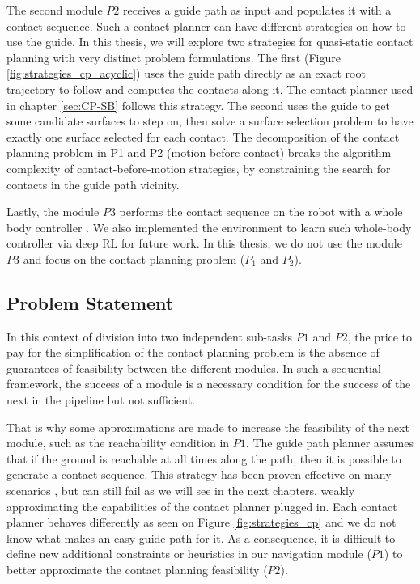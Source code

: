 The second module $P2$ receives a guide path as input and populates it with a contact sequence. Such a contact planner can have different strategies on how to use the guide. In this thesis, we will explore two strategies for quasi-static contact planning with very distinct problem formulations. 
The first (Figure \ref{fig:strategies_cp_acyclic}) uses the guide path directly as an exact root trajectory to follow and computes the contacts along it. The contact planner used in chapter \ref{sec:CP-SB} follows this strategy.
The second uses the guide to get some candidate surfaces to step on, then solve a surface selection problem to have exactly one surface selected for each contact.
The decomposition of the contact planning problem in P1 and P2 (motion-before-contact) breaks the algorithm complexity \cite{AcyclicCP,sl1m_v2} of contact-before-motion strategies, by constraining the search for contacts in the guide path vicinity.

Lastly, the module $P3$ performs the contact sequence on the robot with a whole body controller \cite{loco3d,tsid_prete_2016,Tonneau2018_2PAC,deepLoco}. We also implemented the environment to learn such whole-body controller via deep RL \cite{software_robot_RL} for future work.
In this thesis, we do not use the module $P3$ and focus on the contact planning problem ($P_1$ and $P_2$).


\subsection{Problem Statement\label{subsub:problematic_leas}}

In this context of division into two independent sub-tasks $P1$ and $P2$, the price to pay for the simplification of the contact planning problem is the absence of guarantees of feasibility between the different modules.
In such a sequential framework, the success of a module is a necessary condition for the success of the next in the pipeline but not sufficient.

That is why some approximations are made to increase the feasibility of the next module, such as the reachability condition in $P1$. The guide path planner assumes that if the ground is reachable at all times along the path, then it is possible to generate a contact sequence. 
This strategy has been proven effective on many scenarios \cite{AcyclicCP}, but can still fail as we will see in the next chapters, weakly approximating the capabilities of the contact planner plugged in. Each contact planner behaves differently as seen on Figure \ref{fig:strategies_cp} and we do not know what makes an easy guide path for it. As a consequence, it is difficult to define new additional constraints or heuristics in our navigation module ($P1$) to better approximate the contact planning feasibility ($P2$).

